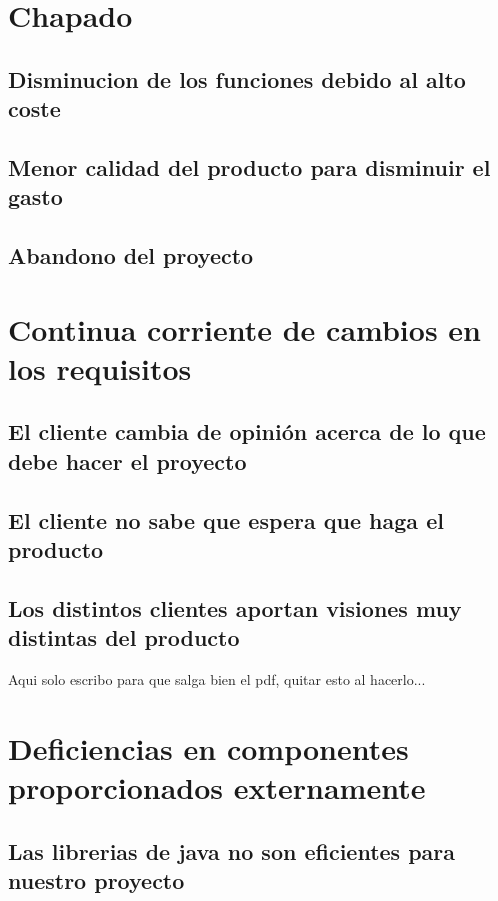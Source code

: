 \documentclass[spanish,a4paper,12pt]{report}	%
\begin{document}
\section{Chapado}
	
	\subsection{Disminucion de los funciones debido al alto coste}

	\subsection{Menor calidad del producto para disminuir el gasto}

	\subsection{Abandono del proyecto}


\section{Continua corriente de cambios en los requisitos}
	
	\subsection{El cliente cambia de opinión acerca de lo que debe hacer el proyecto}

	\subsection{El cliente no sabe que espera que haga el producto}

	\subsection{Los distintos clientes aportan visiones muy distintas del producto}
	Aqui solo escribo para que salga bien el pdf, quitar esto al hacerlo...

\section{Deficiencias en componentes proporcionados externamente}
	
	\subsection{Las librerias de java no son eficientes para nuestro proyecto}
\end{document}
